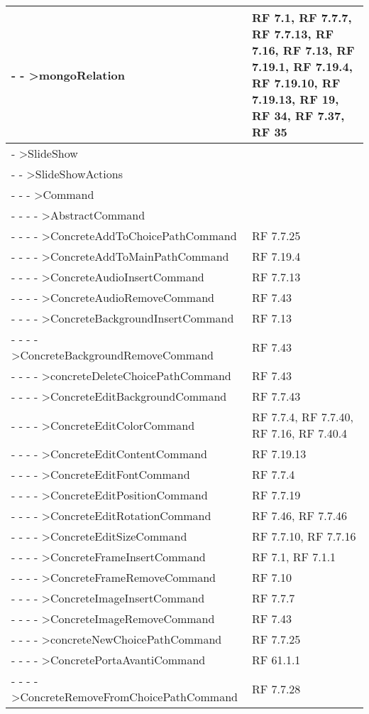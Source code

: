 {\begin{longtable} [c]{| p{8cm} | p{5cm} |}
 \hline 
- - >mongoRelation & RF 7.1, RF 7.7.7, RF 7.7.13, RF 7.16, RF 7.13, RF 7.19.1, RF 7.19.4, RF 7.19.10, RF 7.19.13, RF 19, RF 34, RF 7.37, RF 35\\ 
 \hline 
- >SlideShow & \\ 
 \hline 
- - >SlideShowActions & \\ 
 \hline 
- - - >Command & \\ 
 \hline 
- - - - >AbstractCommand & \\ 
 \hline 
- - - - >ConcreteAddToChoicePathCommand & RF 7.7.25\\ 
 \hline 
- - - - >ConcreteAddToMainPathCommand & RF 7.19.4\\ 
 \hline 
- - - - >ConcreteAudioInsertCommand & RF 7.7.13\\ 
 \hline 
- - - - >ConcreteAudioRemoveCommand & RF 7.43\\ 
 \hline 
- - - - >ConcreteBackgroundInsertCommand & RF 7.13\\ 
 \hline 
- - - - >ConcreteBackgroundRemoveCommand & RF 7.43\\ 
 \hline 
- - - - >concreteDeleteChoicePathCommand & RF 7.43\\ 
 \hline 
- - - - >ConcreteEditBackgroundCommand & RF 7.7.43\\ 
 \hline 
- - - - >ConcreteEditColorCommand & RF 7.7.4, RF 7.7.40, RF 7.16, RF 7.40.4\\ 
 \hline 
- - - - >ConcreteEditContentCommand & RF 7.19.13\\ 
 \hline 
- - - - >ConcreteEditFontCommand & RF 7.7.4\\ 
 \hline 
- - - - >ConcreteEditPositionCommand & RF 7.7.19\\ 
 \hline 
- - - - >ConcreteEditRotationCommand & RF 7.46, RF 7.7.46\\ 
 \hline 
- - - - >ConcreteEditSizeCommand & RF 7.7.10, RF 7.7.16\\ 
 \hline 
- - - - >ConcreteFrameInsertCommand & RF 7.1, RF 7.1.1\\ 
 \hline 
- - - - >ConcreteFrameRemoveCommand & RF 7.10\\ 
 \hline 
- - - - >ConcreteImageInsertCommand & RF 7.7.7\\ 
 \hline 
- - - - >ConcreteImageRemoveCommand & RF 7.43\\ 
 \hline 
- - - - >concreteNewChoicePathCommand & RF 7.7.25\\ 
 \hline 
- - - - >ConcretePortaAvantiCommand & RF 61.1.1\\ 
 \hline 
- - - - >ConcreteRemoveFromChoicePathCommand & RF 7.7.28\\ 

\end{longtable}}
